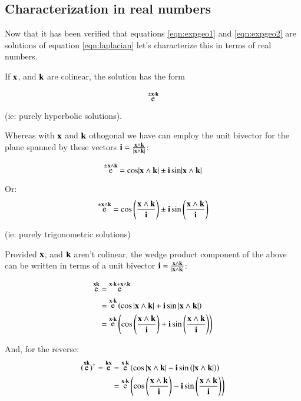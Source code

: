 \documentclass{article}      %
\DeclareMathOperator{\Exp}{e}
\begin{document}
\subsection{ Characterization in real numbers }

Now that it has been verified that equations \ref{eqn:expgeo1} and \ref{eqn:expgeo2} are solutions
of equation \ref{eqn:laplacian} let's characterize this in terms of real numbers.

If $\mathbf{x}$, and $\mathbf{k}$ are colinear, the solution has the form

\begin{equation}
\Exp^{\pm\Bx \cdot \Bk}
\end{equation}

(ie: purely hyperbolic solutions).

Whereas with $\mathbf{x}$ and $\mathbf{k}$ othogonal we have can employ the unit bivector for the plane spanned by these vectors
$\mathbf{i} = \frac{\mathbf{x} \wedge \mathbf{k}}{\lvert{\mathbf{x}\wedge \mathbf{k}}\rvert}$:

\begin{equation}
\Exp^{\pm\Bx \wedge \Bk} = \cos\abs{\Bx \wedge \Bk} \pm \Bi\sin\abs{\Bx \wedge \Bk}
\end{equation}

Or:
\begin{equation}
\Exp^{\pm\Bx \wedge \Bk} = \cos\left(\frac{\Bx \wedge \Bk}{\Bi}\right) \pm \Bi\sin\left(\frac{\Bx \wedge \Bk}{\Bi}\right)
\end{equation}

(ie: purely trigonometric solutions)

Provided $\mathbf{x}$, and $\mathbf{k}$ aren't colinear, the wedge product component of the above can be written in terms of a unit bivector
$\mathbf{i} = \frac{\mathbf{x} \wedge \mathbf{k}}{\lvert{\mathbf{x}\wedge \mathbf{k}}\rvert}$:

\begin{align*}
\Exp^{\Bx\Bk} &= \Exp^{\Bx \cdot \Bk + \Bx \wedge \Bk} \\
&= \Exp^{\Bx \cdot \Bk} \left( \cos{\abs{\Bx \wedge \Bk}} + \Bi \sin{\abs{\Bx \wedge \Bk}} \right) \\
&= \Exp^{\Bx \cdot \Bk} \left( \cos\left(\frac{\Bx \wedge \Bk}{\Bi}\right) + \Bi \sin\left(\frac{\Bx \wedge \Bk}{\Bi}\right) \right) \\
\end{align*}

And, for the reverse:
\begin{align*}
(\Exp^{\Bx\Bk})^\dagger = \Exp^{\Bk\Bx}
&= \Exp^{\Bx \cdot \Bk} \left( \cos{\abs{\Bx \wedge \Bk}} - \Bi \sin\left(\abs{\Bx \wedge \Bk}\right) \right) \\
&= \Exp^{\Bx \cdot \Bk} \left( \cos\left(\frac{\Bx \wedge \Bk}{\Bi}\right) - \Bi \sin\left(\frac{\Bx \wedge \Bk}{\Bi}\right) \right) \\
\end{align*}
\end{document}
